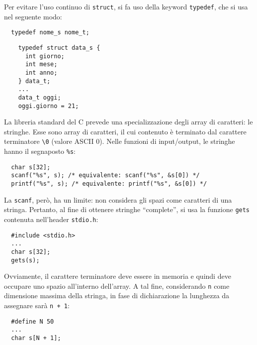 Per evitare l'uso continuo di \verb|struct|, si fa uso della keyword \verb|typedef|, che si usa nel seguente modo:
\begin{verbatim}
  typedef nome_s nome_t;
\end{verbatim}

\begin{example}
  \begin{verbatim}
    typedef struct data_s {
      int giorno;
      int mese;
      int anno;
    } data_t;
    ...
    data_t oggi;
    oggi.giorno = 21;
  \end{verbatim}
\end{example}

La libreria standard del C prevede una specializzazione degli array di caratteri: le stringhe. Esse sono array di caratteri, il cui contenuto è terminato dal carattere terminatore \verb|\0| (valore ASCII 0). Nelle funzioni di input/output, le stringhe hanno il segnaposto \verb|%s|:
\begin{verbatim}
  char s[32];
  scanf("%s", s); /* equivalente: scanf("%s", &s[0]) */
  printf("%s", s); /* equivalente: printf("%s", &s[0]) */
\end{verbatim}

La \verb|scanf|, però, ha un limite: non considera gli spazi come caratteri di una stringa. Pertanto, al fine di ottenere stringhe ``complete'', si usa la funzione \verb|gets| contenuta nell'header \verb|stdio.h|:
\begin{verbatim}
  #include <stdio.h>
  ...
  char s[32];
  gets(s);
\end{verbatim}

Ovviamente, il carattere terminatore deve essere in memoria e quindi deve occupare uno spazio all'interno dell'array. A tal fine, considerando \verb|n| come dimensione massima della stringa, in fase di dichiarazione la lunghezza da assegnare sarà \verb|n + 1|:
\begin{verbatim}
  #define N 50
  ...
  char s[N + 1];
\end{verbatim}